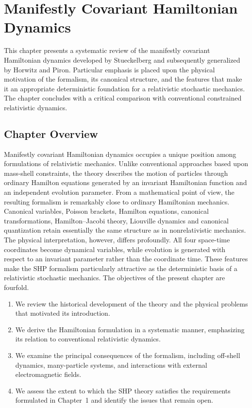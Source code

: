 \chapter{Manifestly Covariant Hamiltonian Dynamics}
This chapter presents a systematic review of the manifestly covariant
Hamiltonian dynamics developed by Stueckelberg and subsequently
generalized by Horwitz and Piron. Particular emphasis is placed upon the
physical motivation of the formalism, its canonical structure, and the
features that make it an appropriate deterministic foundation for a
relativistic stochastic mechanics. The chapter concludes with a critical
comparison with conventional constrained relativistic dynamics.
\section{Chapter Overview}
Manifestly covariant Hamiltonian dynamics occupies a unique position
among formulations of relativistic mechanics. Unlike conventional
approaches based upon mass-shell constraints, the theory describes the
motion of particles through ordinary Hamilton equations generated by an
invariant Hamiltonian function and an independent evolution parameter.
From a mathematical point of view, the resulting formalism is
remarkably close to ordinary Hamiltonian mechanics. Canonical variables,
Poisson brackets, Hamilton equations, canonical transformations,
Hamilton–Jacobi theory, Liouville dynamics and canonical quantization
retain essentially the same structure as in nonrelativistic mechanics.
The physical interpretation, however, differs profoundly. All four
space-time coordinates become dynamical variables, while evolution is
generated with respect to an invariant parameter rather than the
coordinate time.
These features make the SHP formalism particularly attractive as the
deterministic basis of a relativistic stochastic mechanics.
The objectives of the present chapter are fourfold.
\begin{enumerate}
   \item
    We review the historical development of the theory and the
    physical problems that motivated its introduction.
   \item
    We derive the Hamiltonian formulation in a systematic manner,
    emphasizing its relation to conventional relativistic dynamics.
   \item
    We examine the principal consequences of the formalism,
    including off-shell dynamics, many-particle systems, and interactions
    with external electromagnetic fields.
   \item
    We assess the extent to which the SHP theory satisfies the
    requirements formulated in Chapter~1 and identify the issues that remain
    open.
\end{enumerate}
